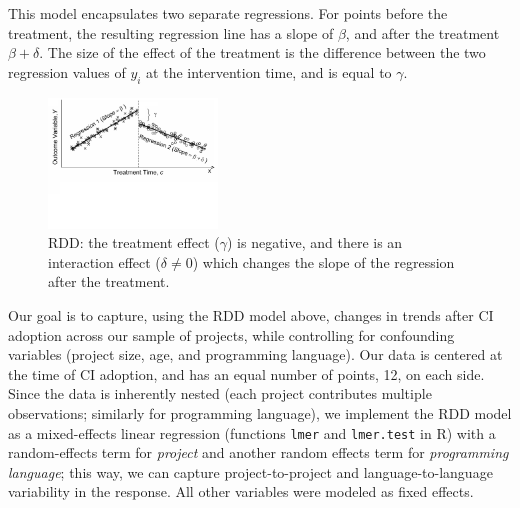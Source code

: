 
This model encapsulates two separate regressions.
For points before the treatment, the resulting regression line has a slope of 
$\beta$, and after the treatment $\beta + \delta$.
The size of the effect of the treatment is the difference between the two 
regression values of $y_i$ at the intervention time,
and is equal to $\gamma$.

\begin{figure}[t]
	\centering
	\includegraphics[width=0.4\textwidth, clip=true, trim=0 250 0 0]{figures/rdd.pdf}
	\caption{RDD: the treatment effect ($\gamma$) 
is negative, and there is an interaction effect ($\delta \neq 0$) which changes 
the slope of the regression after the treatment.}\vspace{-0.4cm}
	\label{RDDIllustration}
\end{figure}

Our goal is to capture, using the RDD model above, changes in trends after CI 
adoption across our sample of projects, while controlling for confounding variables 
(\eg project size, age, and programming language).
Our data is centered at the time of CI adoption, and has an equal number of points, 
12, on each side.
Since the data is inherently nested (each project contributes multiple observations; 
similarly for programming language), we implement the RDD model as a 
mixed-effects linear regression (functions \texttt{lmer} and \texttt{lmer.test} in R) 
with a random-effects term for \emph{project} and another random effects term 
for \emph{programming language}; this way, we can capture project-to-project and 
language-to-language variability in the response.
All other variables were modeled as fixed effects.

